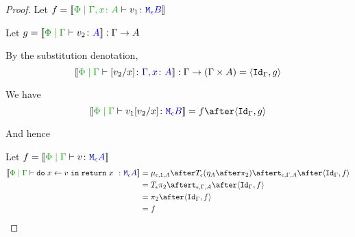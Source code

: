 \documentclass{report}
\begin{document}
\begin{framed}
\begin{proof}
        
        \case{\eqleftunit}
        Let $f = \deno{\etyperelation{\P}{\gax}{v_1}{\meb}}$
        
        Let $g = \deno{\gpetyperelation{v_2}{A}}: \G \rightarrow A$
        
        By the substitution denotation, $$\deno{\etyperelation{\P}{\G}{\ssub{x}{v_2}}{\gax}}: \G \rightarrow (\G \times A) = \pr{\idg}{g}$$
        
        We have $$\deno{\gpetyperelation{v_1\ssub{x}{v_2}}{\meb}} = f \after \pr{\idg}{g}$$
        
        And hence
        
        
        
        
        
        \case{\eqassociativity}
        
        Let $f = \deno{\gpetyperelation{v}{\mea}}$ 
            \begin{align*}
                \deno{\gpetyperelation{\doin{x}{v}{\return{x}}}{\mea}}  & = \bind{\e}{\1}{A} \after \T{\e}{(\point{A} \after \pp)} \after \tstrength{\e}{\G}{A}\after \pr{\idg}{f} \\
                & = \T{\e}{\pp} \after \tstrength{\e}{\G}{A} \after \pr {\idg}{f} \\
                & = \pp \after \pr{\idg}{f}\\
                & = f
        \end{align*}
        

\end{proof}
\end{framed}
\end{document}
